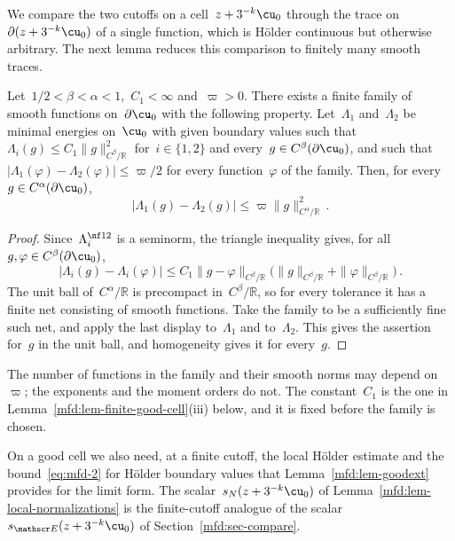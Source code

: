 \documentclass[11pt]{amsart}
\begin{document}
We compare the two cutoffs on a cell~$z+3^{-k}\cu_0$ through the trace on~$\partial(z+3^{-k}\cu_0)$ of a single function, which is H\"older continuous but otherwise arbitrary. The next lemma reduces this comparison to finitely many smooth traces.

\begin{lemma}
\label{mfd:lem-finite-trace-tests}
Let~$1/2<\beta<\alpha<1$,~$C_1<\infty$ and~$\varpi>0$. There exists a finite family of smooth functions on~$\partial \cu_0$ with the following property. Let~$\Lambda_1$ and~$\Lambda_2$ be minimal energies on~$\cu_0$ with given boundary values such that~$\Lambda_i(g)\leq C_1\|g\|_{C^\beta/\mathbb R}^2$ for~$i\in\{1,2\}$ and every~$g\in C^\beta(\partial \cu_0)$, and such that~$|\Lambda_1(\varphi)-\Lambda_2(\varphi)|\leq\varpi/2$ for every function~$\varphi$ of the family. Then, for every~$g\in C^\alpha(\partial \cu_0)$,
\begin{equation*}
	|\Lambda_1(g)-\Lambda_2(g)|
	\leq\varpi\|g\|_{C^\alpha/\mathbb R}^2\,.
\end{equation*}
\end{lemma}
\begin{proof}
Since~$\Lambda_i^{\nf12}$ is a seminorm, the triangle inequality gives, for all~$g,\varphi\in C^\beta(\partial \cu_0)$,
\begin{equation*}
	|\Lambda_i(g)-\Lambda_i(\varphi)|
	\leq C_1\|g-\varphi\|_{C^\beta/\mathbb R}
	\bigl(\|g\|_{C^\beta/\mathbb R}+\|\varphi\|_{C^\beta/\mathbb R}\bigr)\,.
\end{equation*}
The unit ball of~$C^\alpha/\mathbb R$ is precompact in~$C^\beta/\mathbb R$, so for every tolerance it has a finite net consisting of smooth functions. Take the family to be a sufficiently fine such net, and apply the last display to~$\Lambda_1$ and to~$\Lambda_2$. This gives the assertion for~$g$ in the unit ball, and homogeneity gives it for every~$g$.
\end{proof}

The number of functions in the family and their smooth norms may depend on~$\varpi$; the exponents and the moment orders do not. The constant~$C_1$ is the one in Lemma~\ref{mfd:lem-finite-good-cell}(iii) below, and it is fixed before the family is chosen.

\smallskip

On a good cell we also need, at a finite cutoff, the local H\"older estimate and the bound~\eqref{eq:mfd-2} for H\"older boundary values that Lemma~\ref{mfd:lem-goodext} provides for the limit form. The scalar~$s_N(z+3^{-k}\cu_0)$ of Lemma~\ref{mfd:lem-local-normalizations} is the finite-cutoff analogue of the scalar~$s_{\mathscr E}(z+3^{-k}\cu_0)$ of Section~\ref{mfd:sec-compare}.
\end{document}
